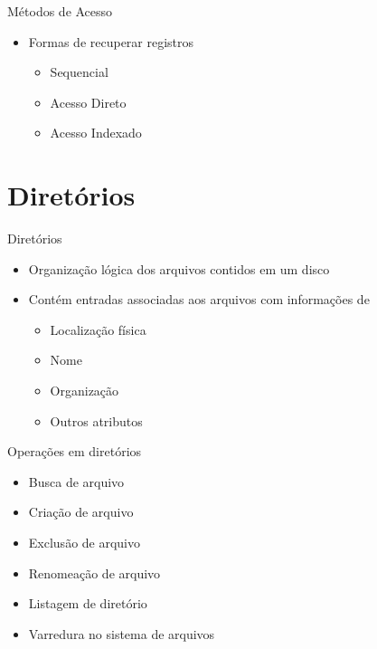 \documentclass[aspectratio=169,
				xcolor=table]{beamer}
\begin{document}
	\begin{frame}{Métodos de Acesso}
		\begin{itemize}
			\item Formas de recuperar registros
			\begin{itemize}
				\item Sequencial
				\item Acesso Direto
				\item Acesso Indexado
			\end{itemize}
		\end{itemize}
		
	\end{frame}
	
	\section{Diretórios}
	\begin{frame}{Diretórios}
		\begin{itemize}
			\item Organização lógica dos arquivos contidos em um disco
			\vspace{1em}
			\item Contém entradas associadas aos arquivos com informações de
			\begin{itemize}
				\item Localização física
				\item Nome
				\item Organização
				\item Outros atributos
			\end{itemize}
			
		\end{itemize}
	\end{frame}
	
	\begin{frame}{Operações em diretórios}
		\begin{itemize}
			\item Busca de arquivo
			\vspace{1em}
			\item Criação de arquivo
			\vspace{1em}
			\item Exclusão de arquivo
			\vspace{1em}
			\item Renomeação de arquivo
			\vspace{1em}
			\item Listagem de diretório
			\vspace{1em}
			\item Varredura no sistema de arquivos
		\end{itemize}
		
	\end{frame}
		
\end{document}
